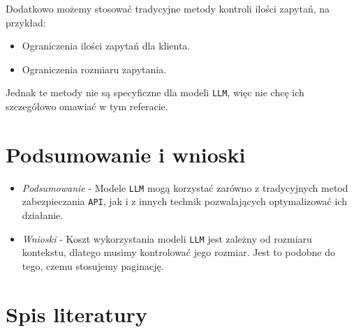 \documentclass[12pt,a4paper]{article}
\begin{document}
Dodatkowo możemy stosować tradycyjne metody kontroli ilości zapytań, na
przykład:

\begin{itemize}
  \item Ograniczenia ilości zapytań dla klienta.
  \item Ograniczenia rozmiaru zapytania.
\end{itemize}

Jednak te metody nie są specyficzne dla modeli \texttt{LLM}, więc nie chcę ich
szczegółowo omawiać w tym referacie.

\newpage

\section{Podsumowanie i wnioski}

\begin{itemize}
  \item \textit{Podsumowanie} - Modele \texttt{LLM} mogą korzystać zarówno z
    tradycyjnych metod zabezpieczania \texttt{API}, jak i z innych technik
    pozwalających optymalizować ich działanie.
  \item \textit{Wnioski} - Koszt wykorzystania modeli \texttt{LLM} jest zależny
    od rozmiaru kontekstu, dlatego musimy kontrolować jego rozmiar. Jest to
    podobne do tego, czemu stosujemy paginację.
\end{itemize}

\newpage
\section{Spis literatury}

\printbibliography[heading=none] 
\end{document}

